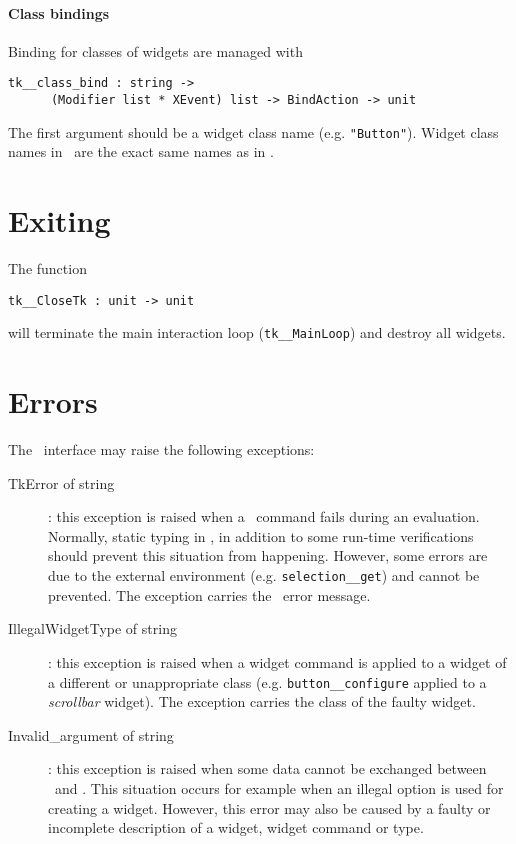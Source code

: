 \paragraph{Class bindings}
\mbox{}\newline

Binding for classes of widgets are managed with
\begin{verbatim}
tk__class_bind : string -> 
      (Modifier list * XEvent) list -> BindAction -> unit
\end{verbatim} 
The first argument should be a widget class name (e.g. \verb|"Button"|).
Widget class names in \camltk\ are the exact same names as in \tk.

\section{Exiting}
The function
\begin{verbatim}
tk__CloseTk : unit -> unit
\end{verbatim} 
will terminate the main interaction loop (\verb|tk__MainLoop|) and
destroy all widgets.


\section{Errors}
The \camltk\ interface may raise the following exceptions:
\begin{description}
\item[TkError of string]: this exception is raised when a \tcl\tk\ command
fails during an evaluation. Normally, static typing in \caml, in addition to
some run-time verifications should prevent this situation from happening.
However, some errors are due to the external environment (e.g.
\verb|selection__get|) and cannot be prevented. The exception carries the
\tcl\tk\ error message.

\item[IllegalWidgetType of string]:
this exception is raised when a widget command is applied to a widget of a
different or unappropriate class (e.g. \verb|button__configure| applied to
a {\em scrollbar} widget). The exception carries the class of the faulty
widget.

\item[Invalid\_argument of string]:
this exception is raised  when some data cannot be exchanged between \caml\
and \tk. This situation occurs for example when an illegal option is used
for creating a widget. However, this error may also be caused by a faulty or
incomplete description of a widget, widget command or type.
\end{description} 

